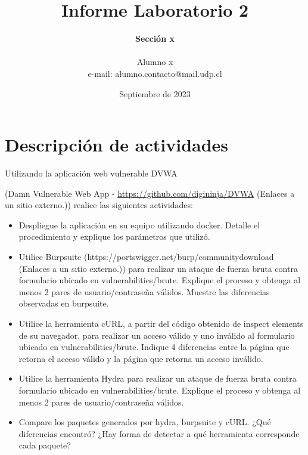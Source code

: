 \documentclass[letter,12pt]{article}
\begin{document}
%
   \title{\Huge{Informe Laboratorio 2}}

   \author{\textbf{Sección x} \\  \\Alumno x \\ e-mail: alumno.contacto@mail.udp.cl}
          
   \date{Septiembre de 2023}

   \maketitle
   
   \tableofcontents
 
  \newpage
  

\section{Descripción de actividades}
Utilizando la aplicación web vulnerable DVWA

(Damn Vulnerable Web App - \href{https://github.com/digininja/DVWA}{https://github.com/digininja/DVWA} (Enlaces a un sitio externo.)) realice las siguientes actividades:


\begin{itemize}
    \item Despliegue la aplicación en su equipo utilizando docker. Detalle el procedimiento y explique los parámetros que utilizó.
    \item Utilice Burpsuite (https://portswigger.net/burp/communitydownload (Enlaces a un sitio externo.)) para realizar un ataque de fuerza bruta contra formulario ubicado en vulnerabilities/brute. Explique el proceso y obtenga al menos 2 pares de usuario/contraseña válidos. Muestre las diferencias observadas en burpsuite.
    \item Utilice la herramienta cURL, a partir del código obtenido de inspect elements de su navegador, para realizar un acceso válido y uno inválido al formulario ubicado en vulnerabilities/brute. Indique 4 diferencias entre la página que retorna el acceso válido y la página que retorna un acceso inválido.
    \item Utilice la herramienta Hydra para realizar un ataque de fuerza bruta contra formulario ubicado en vulnerabilities/brute. Explique el proceso y obtenga al menos 2 pares de usuario/contraseña válidos.
    \item Compare los paquetes generados por hydra, burpsuite y cURL. ¿Qué diferencias encontró? ¿Hay forma de detectar a qué herramienta corresponde cada paquete?
\end{itemize}
\end{document}
